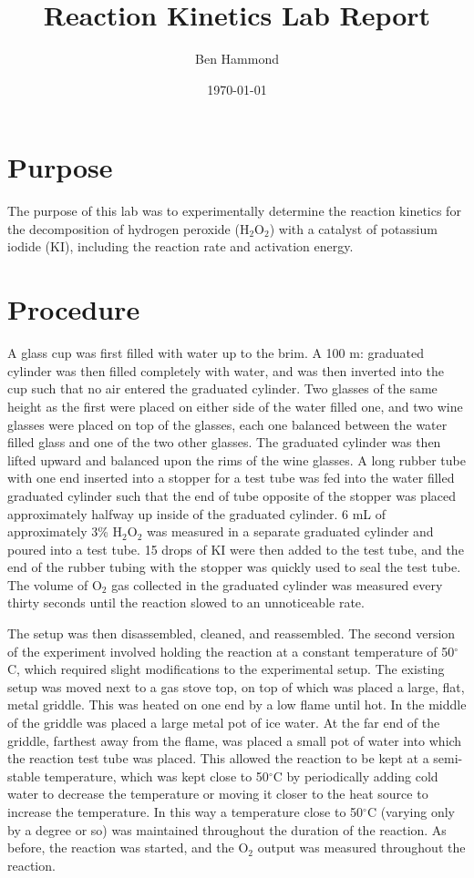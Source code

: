\documentclass[12pt]{article}
\title{Reaction Kinetics Lab Report}
\author{Ben Hammond}
\date{\today}
\begin{document}
	\maketitle
	\newpage

	\section{Purpose}
	The purpose of this lab was to experimentally determine the reaction kinetics for the decomposition of hydrogen peroxide ($\text{H}_2\text{O}_2$) with a catalyst of potassium iodide (KI), including the reaction rate and activation energy.
	
	\section{Procedure}
	A glass cup was first filled with water up to the brim. A 100 m: graduated cylinder was then filled completely with water, and was then inverted into the cup such that no air entered the graduated cylinder. Two glasses of the same height as the first were placed on either side of the water filled one, and two wine glasses were placed on top of the glasses, each one balanced between the water filled glass and one of the two other glasses. The graduated cylinder was then lifted upward and balanced upon the rims of the wine glasses. A long rubber tube with one end inserted into a stopper for a test tube was fed into the water filled graduated cylinder such that the end of tube opposite of the stopper was placed approximately halfway up inside of the graduated cylinder. 6 mL of approximately 3\% $\text{H}_2\text{O}_2$ was measured in a separate graduated cylinder and poured into a test tube. 15 drops of KI were then added to the test tube, and the end of the rubber tubing with the stopper was quickly used to seal the test tube. The volume of $\text{O}_2$ gas collected in the graduated cylinder was measured every thirty seconds until the reaction slowed to an unnoticeable rate.
	
	The setup was then disassembled, cleaned, and reassembled. The second version of the experiment involved holding the reaction at a constant temperature of 50$^\circ$C, which required slight modifications to the experimental setup. The existing setup was moved next to a gas stove top, on top of which was placed a large, flat, metal griddle. This was heated on one end by a low flame until hot. In the middle of the griddle was placed a large metal pot of ice water. At the far end of the griddle, farthest away from the flame, was placed a small pot of water into which the reaction test tube was placed. This allowed the reaction to be kept at a semi-stable temperature, which was kept close to 50$^\circ$C by periodically adding cold water to decrease the temperature or moving it closer to the heat source to increase the temperature. In this way a temperature close to 50$^\circ$C (varying only by a degree or so) was maintained throughout the duration of the reaction. As before, the reaction was started, and the $\text{O}_2$ output was measured throughout the reaction.
\end{document}
